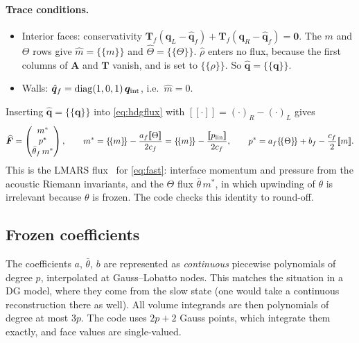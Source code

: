 \documentclass[11pt,a4paper]{article}
\newcommand{\avg}[1]{\{\!\{#1\}\!\}}
\newcommand{\jump}[1]{[\![#1]\!]}
\newcommand{\qh}{\hat{\bm q}}
\newcommand{\q}{\bm q}
\newcommand{\thb}{\bar\theta}
\begin{document}
\paragraph{Trace conditions.}
\begin{itemize}
\item Interior faces: conservativity
  $\bm T_f(\q_L-\qh_f)+\bm T_f(\q_R-\qh_f)=\bm 0$. The $m$ and $\Theta$ rows give
  $\hat m=\avg m$ and $\hat\Theta=\avg\Theta$. $\hat\rho$ enters no flux, because the first
  columns of $\bm A$ and $\bm T$ vanish, and is set to $\avg\rho$. So $\qh=\avg{\q}$.
\item Walls: $\qh_f=\operatorname{diag}(1,0,1)\,\q_{\rm int}$, i.e.\ $\hat m=0$.
\end{itemize}
Inserting $\qh=\avg{\q}$ into \eqref{eq:hdgflux} with $\jump{\cdot}=(\cdot)_R-(\cdot)_L$ gives
\begin{equation}\label{eq:lmars}
\widehat{\bm F}=\begin{pmatrix}m^\ast\\ p^\ast\\ \thb_f\,m^\ast\end{pmatrix},\qquad
m^\ast=\avg m-\frac{a_f\jump{\Theta}}{2c_f}=\avg m-\frac{\jump{p_{\rm lin}}}{2c_f},\qquad
p^\ast=a_f\avg\Theta+b_f-\frac{c_f}{2}\jump m .
\end{equation}
This is the LMARS flux~\cite{chen2013} for \eqref{eq:fast}: interface momentum and pressure from
the acoustic Riemann invariants, and the $\Theta$ flux $\thb\,m^\ast$, in which upwinding of
$\theta$ is irrelevant because $\theta$ is frozen. The code checks this identity to round-off.

\subsection{Frozen coefficients}
The coefficients $a$, $\thb$, $b$ are represented as \emph{continuous} piecewise polynomials of
degree $p$, interpolated at Gauss--Lobatto nodes. This matches the situation in a DG model, where
they come from the slow state (one would take a continuous reconstruction there as well).
All volume integrands are then polynomials of degree at most $3p$. The code uses $2p+2$ Gauss
points, which integrate them exactly, and face values are single-valued.
\end{document}
